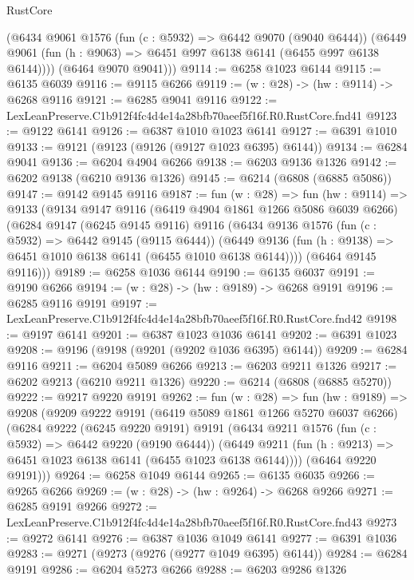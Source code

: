\begin{lexlean}{RustCore}
\begin{coremodule}
        (@6434
          @9061
          @1576
          (fun (c : @5932) => @6442 @9070 (@9040 @6444))
          (@6449 @9061 (fun (h : @9063) => @6451 @997 @6138 @6141 (@6455 @997 @6138 @6144))))
        (@6464 @9070 @9041)))
@9114 := @6258 @1023 @6144
@9115 := @6135 @6039
@9116 := @9115 @6266
@9119 := (w : @28) -> (hw : @9114) -> @6268 @9116
@9121 := @6285 @9041 @9116
@9122 := LexLeanPreserve.C1b912f4fc4d4e14a28bfb70aeef5f16f.R0.RustCore.fnd41
@9123 := @9122 @6141
@9126 := @6387 @1010 @1023 @6141
@9127 := @6391 @1010
@9133 := @9121 (@9123 (@9126 (@9127 @1023 @6395) @6144))
@9134 := @6284 @9041
@9136 := @6204 @4904 @6266
@9138 := @6203 @9136 @1326
@9142 := @6202 @9138 (@6210 @9136 @1326)
@9145 := @6214 (@6808 (@6885 @5086))
@9147 := @9142 @9145 @9116
@9187 := fun (w : @28) =>
  fun (hw : @9114) =>
  @9133
    (@9134
      @9147
      @9116
      (@6419 @4904 @1861 @1266 @5086 @6039 @6266)
      (@6284
        @9147
        (@6245 @9145 @9116)
        @9116
        (@6434
          @9136
          @1576
          (fun (c : @5932) => @6442 @9145 (@9115 @6444))
          (@6449 @9136 (fun (h : @9138) => @6451 @1010 @6138 @6141 (@6455 @1010 @6138 @6144))))
        (@6464 @9145 @9116)))
@9189 := @6258 @1036 @6144
@9190 := @6135 @6037
@9191 := @9190 @6266
@9194 := (w : @28) -> (hw : @9189) -> @6268 @9191
@9196 := @6285 @9116 @9191
@9197 := LexLeanPreserve.C1b912f4fc4d4e14a28bfb70aeef5f16f.R0.RustCore.fnd42
@9198 := @9197 @6141
@9201 := @6387 @1023 @1036 @6141
@9202 := @6391 @1023
@9208 := @9196 (@9198 (@9201 (@9202 @1036 @6395) @6144))
@9209 := @6284 @9116
@9211 := @6204 @5089 @6266
@9213 := @6203 @9211 @1326
@9217 := @6202 @9213 (@6210 @9211 @1326)
@9220 := @6214 (@6808 (@6885 @5270))
@9222 := @9217 @9220 @9191
@9262 := fun (w : @28) =>
  fun (hw : @9189) =>
  @9208
    (@9209
      @9222
      @9191
      (@6419 @5089 @1861 @1266 @5270 @6037 @6266)
      (@6284
        @9222
        (@6245 @9220 @9191)
        @9191
        (@6434
          @9211
          @1576
          (fun (c : @5932) => @6442 @9220 (@9190 @6444))
          (@6449 @9211 (fun (h : @9213) => @6451 @1023 @6138 @6141 (@6455 @1023 @6138 @6144))))
        (@6464 @9220 @9191)))
@9264 := @6258 @1049 @6144
@9265 := @6135 @6035
@9266 := @9265 @6266
@9269 := (w : @28) -> (hw : @9264) -> @6268 @9266
@9271 := @6285 @9191 @9266
@9272 := LexLeanPreserve.C1b912f4fc4d4e14a28bfb70aeef5f16f.R0.RustCore.fnd43
@9273 := @9272 @6141
@9276 := @6387 @1036 @1049 @6141
@9277 := @6391 @1036
@9283 := @9271 (@9273 (@9276 (@9277 @1049 @6395) @6144))
@9284 := @6284 @9191
@9286 := @6204 @5273 @6266
@9288 := @6203 @9286 @1326

\end{coremodule}
\end{lexlean}
